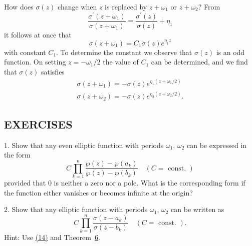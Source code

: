 How does $\sigma(z)$ change when $z$ is replaced by $z + \omega_1$ or $z + \omega_2$? From
\begin{equation*}
\frac {\sigma^ {\prime} (z + \omega_ {1})}{\sigma (z + \omega_ {1})} = \frac {\sigma^ {\prime} (z)}{\sigma (z)} + \eta_ {1}
\end{equation*}
it follows at once that
\begin{equation*}
\sigma (z + \omega_ {1}) = C _ {1} \sigma (z) e ^ {\eta_ {1} z}
\end{equation*}
with constant $C_{1}$. To determine the constant we observe that $\sigma(z)$ is an odd function. On setting $z = -\omega_{1}/2$ the value of $C_{1}$ can be determined, and we find that $\sigma(z)$ satisfies
\begin{equation*}
\begin{array}{l} \sigma (z + \omega_ {1}) = - \sigma (z) e ^ {\eta_ {1} (z + \omega_ {1} / 2)} \\ \sigma (z + \omega_ {2}) = - \sigma (z) e ^ {\eta_ {2} (z + \omega_ {2} / 2)}. \end{array}\tag{14}\label{eq:7.14}
\end{equation*}
\subsection*{EXERCISES}
1. Show that any even elliptic function with periods $\omega_{1}$, $\omega_{2}$ can be expressed in the form
\begin{equation*}
C \prod_ {k = 1} ^ {n} \frac {\wp (z) - \wp (a _ {k})}{\wp (z) - \wp (b _ {k})} \quad (C = \text { const. })
\end{equation*}
provided that 0 is neither a zero nor a pole. What is the corresponding form if the function either vanishes or becomes infinite at the origin?

2. Show that any elliptic function with periods $\omega_{1}$, $\omega_{2}$ can be written as
\begin{equation*}
C \prod_ {k = 1} ^ {n} \frac {\sigma (z - a _ {k})}{\sigma (z - b _ {k})} \quad (C = \text { const. }).
\end{equation*}
Hint: Use \hyperref[eq:7.14]{(14)} and Theorem~\hyperref[thm:7.6]{6}.

